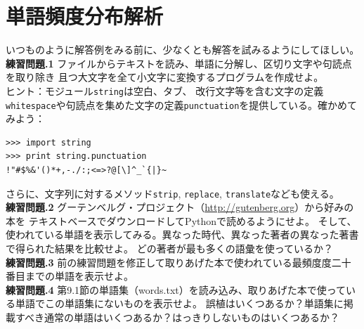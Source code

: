 \documentclass[a4j,12pt,makeidx]{jbook}
\newcommand{\tp}{\thechapter}
\begin{document}
\section{単語頻度分布解析}
いつものように解答例をみる前に、少なくとも解答を試みるようにしてほしい。 \\

\noindent
{\bf 練習問題\tp.1} ファイルからテキストを読み、単語に分解し、区切り文字や句読点を取り除き
且つ大文字を全て小文字に変換するプログラムを作成せよ。 \\
ヒント：モジュール{\tt string}は空白、タブ、
改行文字等を含む文字の定義{\tt whitespace}や句読点を集めた文字の定義{\tt punctuation}を提供している。確かめてみよう：
\begin{verbatim}
>>> import string
>>> print string.punctuation
!"#$%&'()*+,-./:;<=>?@[\]^_`{|}~ 
\end{verbatim} 
さらに、文字列に対するメソッド{\tt strip}, {\tt replace}, {\tt translate}なども使える。\\

\noindent
{\bf 練習問題\tp.2} グーテンベルグ・プロジェクト（\url{http://gutenberg.org}）から好みの本を
テキストベースでダウンロードしてPythonで読めるようにせよ。
そして、使われている単語を表示してみる。異なった時代、異なった著者の異なった著書で得られた結果を比較せよ。
どの著者が最も多くの語彙を使っているか？\\

\noindent
{\bf 練習問題\tp.3} 前の練習問題を修正して取りあげた本で使われている最頻度度二十番目までの単語を表示せよ。\\

\noindent
{\bf 練習問題\tp.4} 第9.1節の単語集（words.txt）を読み込み、取りあげた本で使っている単語でこの単語集にないものを表示せよ。
誤植はいくつあるか？単語集に掲載すべき通常の単語はいくつあるか？はっきりしないものはいくつあるか？
%
\end{document}
